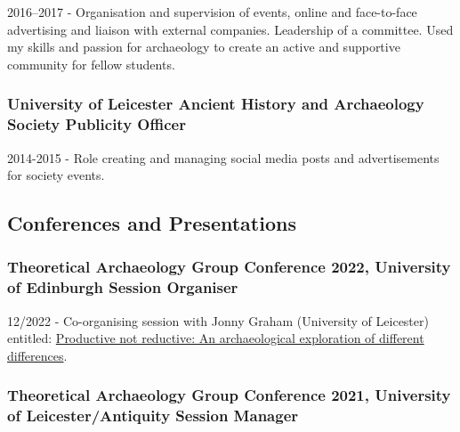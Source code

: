 \documentclass[11pt,a4paper]{article}
\begin{document}
2016--2017 - Organisation and supervision of events, online and
face-to-face advertising and liaison with external companies. Leadership
of a committee. Used my skills and passion for archaeology to create an
active and supportive community for fellow students.

\subsubsection{\texorpdfstring{\textbf{University of Leicester Ancient
History and Archaeology Society} Publicity
Officer}{University of Leicester Ancient History and Archaeology Society Publicity Officer}}\label{university-of-leicester-ancient-history-and-archaeology-society-publicity-officer}

2014-2015 - Role creating and managing social media posts and
advertisements for society events.

\subsection{Conferences and
Presentations}\label{conferences-and-presentations}

\subsubsection{\texorpdfstring{\textbf{Theoretical Archaeology Group
Conference 2022, University of Edinburgh} Session
Organiser}{Theoretical Archaeology Group Conference 2022, University of Edinburgh Session Organiser}}\label{theoretical-archaeology-group-conference-2022-university-of-edinburgh-session-organiser}

12/2022 - Co-organising session with Jonny Graham (University of
Leicester) entitled:
\href{https://tagedinburgh2022.wordpress.com/productive-not-reductive-an-archaeological-exploration-of-different-differences-\%ef\%bf\%bc/}{Productive
not reductive: An archaeological exploration of different differences}.

\subsubsection{\texorpdfstring{\textbf{Theoretical Archaeology Group
Conference 2021, University of Leicester/Antiquity} Session
Manager}{Theoretical Archaeology Group Conference 2021, University of Leicester/Antiquity Session Manager}}\label{theoretical-archaeology-group-conference-2021-university-of-leicesterantiquity-session-manager}
\end{document}

